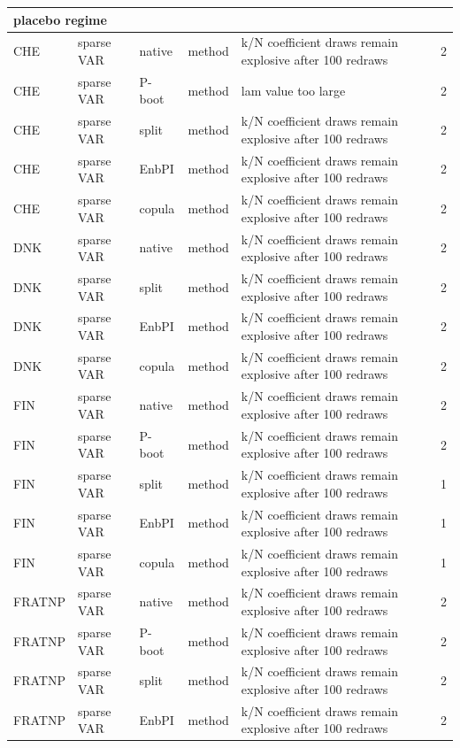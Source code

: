 {\begin{longtable}{@{}lllp{1.6cm}p{6.2cm}r@{}}
\multicolumn{6}{l}{\textbf{placebo regime}} \\
\midrule
CHE & sparse VAR & native & method & k/N coefficient draws remain explosive after 100 redraws & 2 \\
CHE & sparse VAR & P-boot & method & lam value too large & 2 \\
CHE & sparse VAR & split & method & k/N coefficient draws remain explosive after 100 redraws & 2 \\
CHE & sparse VAR & EnbPI & method & k/N coefficient draws remain explosive after 100 redraws & 2 \\
CHE & sparse VAR & copula & method & k/N coefficient draws remain explosive after 100 redraws & 2 \\
DNK & sparse VAR & native & method & k/N coefficient draws remain explosive after 100 redraws & 2 \\
DNK & sparse VAR & split & method & k/N coefficient draws remain explosive after 100 redraws & 2 \\
DNK & sparse VAR & EnbPI & method & k/N coefficient draws remain explosive after 100 redraws & 2 \\
DNK & sparse VAR & copula & method & k/N coefficient draws remain explosive after 100 redraws & 2 \\
FIN & sparse VAR & native & method & k/N coefficient draws remain explosive after 100 redraws & 2 \\
FIN & sparse VAR & P-boot & method & k/N coefficient draws remain explosive after 100 redraws & 2 \\
FIN & sparse VAR & split & method & k/N coefficient draws remain explosive after 100 redraws & 1 \\
FIN & sparse VAR & EnbPI & method & k/N coefficient draws remain explosive after 100 redraws & 1 \\
FIN & sparse VAR & copula & method & k/N coefficient draws remain explosive after 100 redraws & 1 \\
FRATNP & sparse VAR & native & method & k/N coefficient draws remain explosive after 100 redraws & 2 \\
FRATNP & sparse VAR & P-boot & method & k/N coefficient draws remain explosive after 100 redraws & 2 \\
FRATNP & sparse VAR & split & method & k/N coefficient draws remain explosive after 100 redraws & 2 \\
FRATNP & sparse VAR & EnbPI & method & k/N coefficient draws remain explosive after 100 redraws & 2 \\

\end{longtable}}
